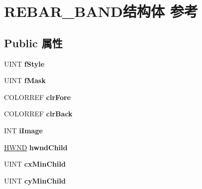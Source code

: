 \hypertarget{struct_r_e_b_a_r___b_a_n_d}{}\section{R\+E\+B\+A\+R\+\_\+\+B\+A\+N\+D结构体 参考}
\label{struct_r_e_b_a_r___b_a_n_d}
\subsection*{Public 属性}
\begin{DoxyCompactItemize}
\item 
\mbox{\label{struct_r_e_b_a_r___b_a_n_d_a563a86289cf8887cb74833796c882401}} 
U\+I\+NT {\bfseries f\+Style}
\item 
\mbox{\label{struct_r_e_b_a_r___b_a_n_d_ae0815811250391cd18cb5adb8d2f35a0}} 
U\+I\+NT {\bfseries f\+Mask}
\item 
\mbox{\label{struct_r_e_b_a_r___b_a_n_d_a7fd55e0a393c8c0afb50c425acecfeb9}} 
C\+O\+L\+O\+R\+R\+EF {\bfseries clr\+Fore}
\item 
\mbox{\label{struct_r_e_b_a_r___b_a_n_d_ab8d193687eb2a1feac2165e19c05223d}} 
C\+O\+L\+O\+R\+R\+EF {\bfseries clr\+Back}
\item 
\mbox{\label{struct_r_e_b_a_r___b_a_n_d_a898c816f5d2c5825fc4c95f023f458b7}} 
I\+NT {\bfseries i\+Image}
\item 
\mbox{\label{struct_r_e_b_a_r___b_a_n_d_a50d6752d4baf18537e2365b46f17963f}} 
\hyperlink{interfacevoid}{H\+W\+ND} {\bfseries hwnd\+Child}
\item 
\mbox{\label{struct_r_e_b_a_r___b_a_n_d_a23434b8f13aa443c5db82e568242d670}} 
U\+I\+NT {\bfseries cx\+Min\+Child}
\item 
\mbox{\label{struct_r_e_b_a_r___b_a_n_d_a64281b3409c4934c8d02ad8613e74194}} 
U\+I\+NT {\bfseries cy\+Min\+Child}
\item 
\mbox{\label{struct_r_e_b_a_r___b_a_n_d_ad0e152a454f6d1aab5090a5cb6517dd9}} 

\end{DoxyCompactItemize}
